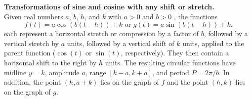\documentclass{ximera}
\begin{document}
\begin{callout}
\textbf{Transformations of sine and cosine with any shift or stretch.}\\
Given real numbers \(a\), \(b\), \(h\), and \(k\) with \(a > 0\) and \(b > 0\) , the functions%
\begin{equation*}
f(t) = a\cos(b(t-h))+k \text{ or } g(t) = a\sin(b(t-h)) + k\text{.}
\end{equation*}
each represent a horizontal stretch or compression by a factor of $b$, followed by a vertical stretch by \(a\) units, followed by a vertical shift of \(k\) units, applied to the parent function (\(\cos(t)\) or \(\sin(t)\), respectively). They then contain a horizontal shift to the right by $h$ units. The resulting circular functions have midline \(y = k\), amplitude \(a\), range \([k-a,k+a]\), and period \(P = 2\pi/b\). In addition, the point \((h,a+k)\) lies on the graph of \(f\) and the point \((h, k)\) lies on the graph of \(g\).
\end{callout}
\end{document}
